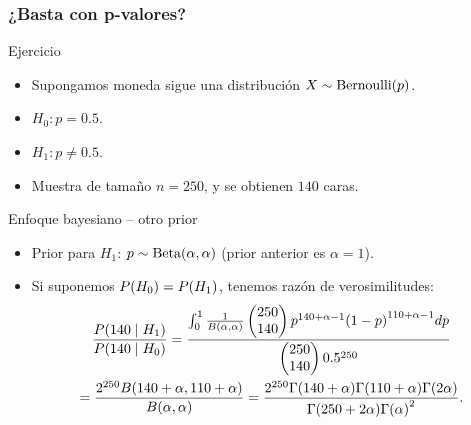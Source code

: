 \documentclass[table]{beamer}
\begin{document}
\begin{frame}[allowframebreaks]
    \frametitle{¿Basta con p-valores?}
    \begin{block}{Ejercicio}
        \begin{itemize}
            \item Supongamos moneda sigue una distribución $X \sim \bernoulli{p}$.
            \item $H_{0}: p = 0.5$.
            \item $H_{1}: p \neq 0.5$.
            \item Muestra de tamaño $n = 250$, y se obtienen $140$ caras.
        \end{itemize}
    \end{block}
    \framebreak
    \begin{block}{Enfoque bayesiano -- otro prior}
        \begin{itemize}
            \item Prior para $H_{1}$: $p \sim \betadist{\alpha}{\alpha}$ (prior anterior es $\alpha = 1$).
            \item Si suponemos $\prob{H_{0}} = \prob{H_{1}}$, tenemos razón de verosimilitudes:
                \begin{multline*}
                    \frac{\prob{140 \mid H_{1}}}{\prob{140 \mid H_{0}}}
                    = \frac{\int_{0}^{1} \frac{1}{\betafunc{\alpha}{\alpha}} \combin{250}{140} p^{140 + \alpha - 1} \parens{1 - p}^{110 + \alpha - 1} d p}{\combin{250}{140} 0.5^{250}}
                    \\
                    = \frac{2^{250} \betafunc{140 + \alpha}{110 + \alpha}}{\betafunc{\alpha}{\alpha}}
                    = \frac{2^{250} \gammafunc{140 + \alpha} \gammafunc{110 + \alpha} \gammafunc{2 \alpha}}{\gammafunc{250 + 2 \alpha} \gammafunc{\alpha}^{2}}
                    .
                \end{multline*}
        \end{itemize}
    \end{block}
\end{frame}
\end{document}
